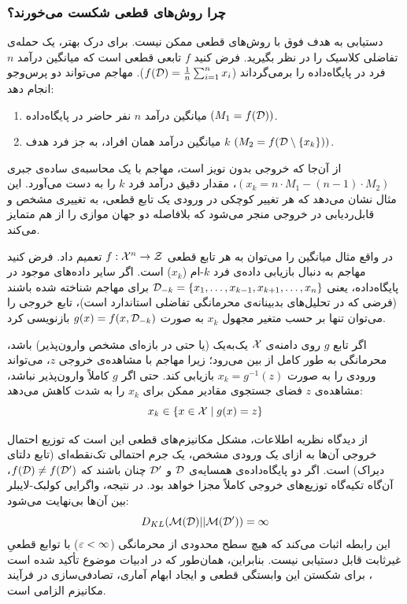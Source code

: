 \subsubsection{چرا روش‌های قطعی شکست می‌خورند؟}
دستیابی به هدف فوق با روش‌های قطعی ممکن نیست. برای درک بهتر، یک حمله‌ی تفاضلی کلاسیک را در نظر بگیرید. فرض کنید $f$ تابعی قطعی است که میانگین درآمد $n$ فرد در پایگاه‌داده را برمی‌گرداند ($f(\Dset) = \frac{1}{n}\sum_{i=1}^n x_i$). مهاجم می‌تواند دو پرس‌وجو انجام دهد:
\begin{enumerate}
 \item میانگین درآمد $n$ نفر حاضر در پایگاه‌داده $\left(M_1 = f(\Dset)\right)$.
 \item میانگین درآمد همان افراد، به جز فرد هدف $k$ $\left(M_2 = f(\Dset \setminus \{x_k\})\right)$.
\end{enumerate}
از آن‌جا که خروجی بدون نویز است، مهاجم با یک محاسبه‌ی ساده‌ی جبری 
$\left(x_k = n \cdot M_1 - (n-1) \cdot M_2\right)$،
مقدار دقیق درآمد فرد $k$ را به دست می‌آورد. این مثال نشان می‌دهد که هر تغییر کوچکی در ورودی یک تابع قطعی، به تغییری مشخص و قابل‌ردیابی در خروجی منجر می‌شود که بلافاصله دو جهان موازی را از هم متمایز می‌کند.

در واقع مثال میانگین را می‌توان به هر تابع قطعی
$f: \Xset^n \to \Zset$ تعمیم داد. فرض کنید مهاجم به دنبال بازیابی داده‌ی فرد $k$-ام ($x_k$) است. اگر سایر داده‌های موجود در پایگاه‌داده، یعنی $\Dset_{-k} = \{x_1, \dots, x_{k-1}, x_{k+1}, \dots, x_n\}$ برای مهاجم شناخته شده باشند (فرضی که در تحلیل‌های بدبینانه‌ی محرمانگی تفاضلی استاندارد است)، تابع خروجی را می‌توان تنها بر حسب متغیر مجهول $x_k$ به صورت $g(x) = f(x, \Dset_{-k})$ بازنویسی کرد.

اگر تابع $g$ روی دامنه‌ی $\Xset$ یک‌به‌یک (یا حتی در بازه‌ای مشخص وارون‌پذیر) باشد، محرمانگی به طور کامل از بین می‌رود؛ زیرا مهاجم با مشاهده‌ی خروجی $z$، می‌تواند ورودی را به صورت $x_k = g^{-1}(z)$ بازیابی کند. حتی اگر $g$ کاملاً وارون‌پذیر نباشد، مشاهده‌ی $z$ فضای جستجوی مقادیر ممکن برای $x_k$ را به شدت کاهش می‌دهد:
\[
    x_k \in \{x \in \Xset \mid g(x) = z\}
\]

از دیدگاه نظریه اطلاعات، مشکل مکانیزم‌های قطعی این است که توزیع احتمال خروجی آن‌ها به ازای یک ورودی مشخص، یک جرم احتمالی تک‌نقطه‌ای (تابع دلتای دیراک) است. اگر دو پایگاه‌داده‌ی همسایه‌ی $\Dset$ و $\Dset'$ چنان باشند که $f(\Dset) \neq f(\Dset')$، آن‌گاه تکیه‌گاه توزیع‌های خروجی کاملاً مجزا خواهد بود. در نتیجه، واگرایی کولبک-لایبلر بین آن‌ها بی‌نهایت می‌شود:
\[
    D_{KL}(\mech(\Dset) || \mech(\Dset')) = \infty
\]
این رابطه اثبات می‌کند که هیچ سطح محدودی از محرمانگی ($\varepsilon < \infty$) با توابع قطعیِ غیرثابت قابل دستیابی نیست. بنابراین، همان‌طور که در ادبیات موضوع تأکید شده است \cite{dwork2014roth}، برای شکستن این وابستگی قطعی و ایجاد ابهام آماری، تصادفی‌سازی در فرآیند مکانیزم الزامی است.





